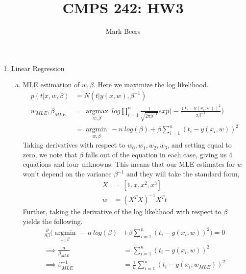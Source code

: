 \documentclass[12pt]{article}
\begin{document}
 
 
 
\title{CMPS 242: HW3}%
\author{Mark Beers %
} %
 
\maketitle
 
\begin{enumerate}
	\item Linear Regression
	\begin{enumerate}[(a)]
		\item MLE estimation of $w, \beta$. Here we maximize the log likelihood. 
		\begin{align*}
		p(t|x, w, \beta) &= N(t|y(x,w), \beta^{-1}) \\
	w_{MLE}, \beta_{MLE}	&= \underset{w, \beta}{\operatorname{argmax}}\  log \prod_{i = 1}^{n} \frac{1}{\sqrt{2\pi \beta^{-1}}}exp\bigg(-\frac{(t_i - y(x_i, w))^2}{2\beta^{-1}}\bigg) \\
	&= \underset{w, \beta}{\operatorname{argmin}}\ -n\ log(\beta) + \beta \sum_{i=1}^{n} (t_i - y(x_i, w))^2
		\end{align*}
		Taking derivatives with respect to $w_0, w_1, w_2, w_3$, and setting equal to zero, we note that $\beta$ falls out of the equation in each case, giving us 4 equations and four unknowns. This means that our MLE estimates for $w$ won't depend on the variance $\beta^{-1}$ and they will take the standard form, 
		\begin{align*}
		X &= [1, x, x^2, x^3]\\
		w &= (X^T X)^{-1}X^T t
		\end{align*}
		Further, taking the derivative of the log likelihood with respect to $\beta$ yields the following. 
		\begin{align*}
		\frac{\partial}{\partial \beta}\bigg(\underset{w, \beta}{\operatorname{argmin}}\ -n\ log(\beta) &+ \beta \sum_{i=1}^{n} (t_i - y(x_i, w))^2\bigg) = 0 \\
		\implies \frac{n}{\beta_{MLE}} &=  \sum_{i=1}^{n} (t_i - y(x_i, w))^2 \\
		\implies \beta_{MLE}^{-1} &= \frac{1}{n}\sum_{i=1}^{n} (t_i - y(x_i, w_{MLE}))^2 
		\end{align*}

\end{enumerate}
\end{enumerate}
\end{document}
